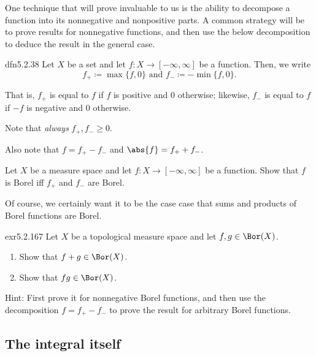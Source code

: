 One technique that will prove invaluable to us is the ability to decompose a function into its nonnegative and nonpositive parts.  A common strategy will be to prove results for nonnegative functions, and then use the below decomposition to deduce the result in the general case.
\begin{dfn}{}{dfn5.2.38}
Let $X$ be a set and let $f\colon X\rightarrow [-\infty ,\infty ]$ be a function.  Then, we write
\begin{equation}
f_+\coloneqq \max \{ f,0\} \text{ and }f_-\coloneqq -\min \{ f,0\} .
\end{equation}
\begin{rmk}
That is, $f_+$ is equal to $f$ if $f$ is positive and $0$ otherwise; likewise, $f_-$ is equal to $f$ if $-f$ is negative and $0$ otherwise.
\end{rmk}
\begin{rmk}
Note that \emph{always} $f_+,f_-\geq 0$.
\end{rmk}
\begin{rmk}
Also note that $f=f_+-f_-$ and $\abs{f}=f_++f_-$.
\end{rmk}
\end{dfn}
\begin{exr}{}{}
Let $X$ be a measure space and let $f\colon X\rightarrow [-\infty ,\infty ]$ be a function.  Show that $f$ is Borel iff $f_+$ and $f_-$ are Borel.
\end{exr}

Of course, we certainly want it to be the case case that sums and products of Borel functions are Borel.
\begin{exr}{}{exr5.2.167}
Let $X$ be a topological measure space and let $f,g\in \Bor (X)$.
\begin{enumerate}
\item Show that $f+g\in \Bor (X)$.
\item Show that $fg\in \Bor (X)$.
\end{enumerate}
\begin{rmk}
Hint:  First prove it for nonnegative Borel functions, and then use the decomposition $f=f_+-f_-$ to prove the result for arbitrary Borel functions.
\end{rmk}
\end{exr}

\subsection{The integral itself}\label{TheIntegralItself}

